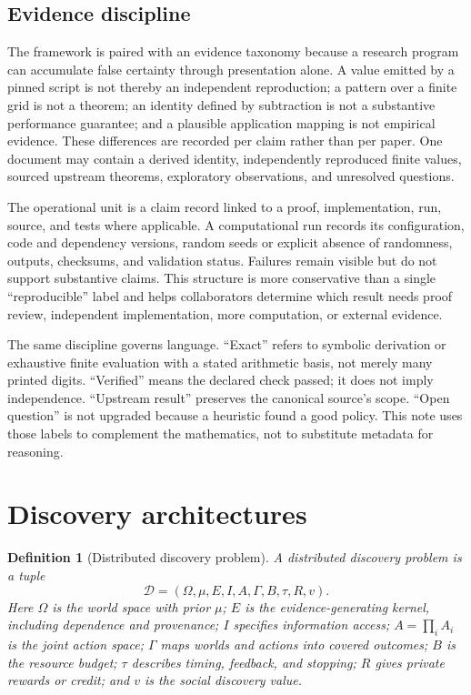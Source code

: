 \documentclass[11pt]{article}
\newtheorem{definition}{Definition}
\theoremstyle{remark}
\begin{document}
\subsection*{Evidence discipline}
The framework is paired with an evidence taxonomy because a research program can accumulate false certainty through presentation alone. A value emitted by a pinned script is not thereby an independent reproduction; a pattern over a finite grid is not a theorem; an identity defined by subtraction is not a substantive performance guarantee; and a plausible application mapping is not empirical evidence. These differences are recorded per claim rather than per paper. One document may contain a derived identity, independently reproduced finite values, sourced upstream theorems, exploratory observations, and unresolved questions.

The operational unit is a claim record linked to a proof, implementation, run, source, and tests where applicable. A computational run records its configuration, code and dependency versions, random seeds or explicit absence of randomness, outputs, checksums, and validation status. Failures remain visible but do not support substantive claims. This structure is more conservative than a single ``reproducible'' label and helps collaborators determine which result needs proof review, independent implementation, more computation, or external evidence.

The same discipline governs language. ``Exact'' refers to symbolic derivation or exhaustive finite evaluation with a stated arithmetic basis, not merely many printed digits. ``Verified'' means the declared check passed; it does not imply independence. ``Upstream result'' preserves the canonical source's scope. ``Open question'' is not upgraded because a heuristic found a good policy. This note uses those labels to complement the mathematics, not to substitute metadata for reasoning.

\section{Discovery architectures}
\begin{definition}[Distributed discovery problem]
A distributed discovery problem is a tuple
\[
\mathcal D=(\Omega,\mu,E,I,A,\Gamma,B,\tau,R,v).
\]
Here $\Omega$ is the world space with prior $\mu$; $E$ is the evidence-generating kernel, including dependence and provenance; $I$ specifies information access; $A=\prod_i A_i$ is the joint action space; $\Gamma$ maps worlds and actions into covered outcomes; $B$ is the resource budget; $\tau$ describes timing, feedback, and stopping; $R$ gives private rewards or credit; and $v$ is the social discovery value.
\end{definition}
\end{document}
